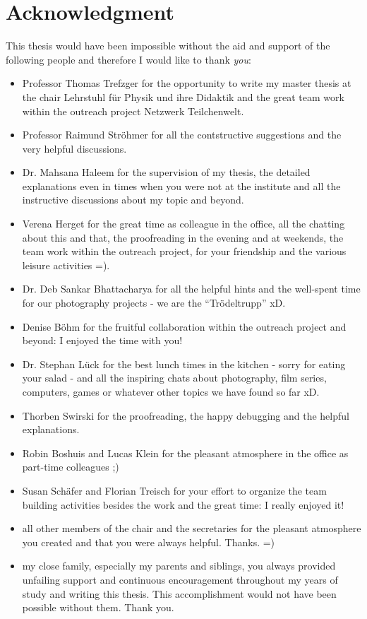 \chapter*{Acknowledgment}
This thesis would have been impossible without the aid and support of the following people and therefore I would like to thank \textit{you}:
\begin{itemize}
 \item Professor Thomas Trefzger for the opportunity to write my master thesis at the chair Lehrstuhl f\"{u}r Physik und ihre Didaktik and the great team work within the outreach project Netzwerk Teilchenwelt.
 \item Professor Raimund Str\"{o}hmer for all the contstructive suggestions and the very helpful discussions.
 \item Dr. Mahsana Haleem for the supervision of my thesis, the detailed explanations even in times when you were not at the institute and all the instructive discussions about my topic and beyond.
 \item Verena Herget for the great time as colleague in the office, all the chatting about this and that, the proofreading in the evening and at weekends, the team work within the outreach project, for your friendship and the various leisure activities =). 
 \item Dr. Deb Sankar Bhattacharya for all the helpful hints and the well-spent time for our photography projects - we are the ``Tr\"{o}deltrupp'' xD.
 \item Denise B\"{o}hm for the fruitful collaboration within the outreach project and beyond: I enjoyed the time with you!
 \item Dr. Stephan L\"{u}ck for the best lunch times in the kitchen - sorry for eating your salad - and all the inspiring chats about photography, film series, computers, games or whatever other topics we have found so far xD.
 \item Thorben Swirski for the proofreading, the happy debugging and the helpful explanations. 
 \item Robin Boshuis and Lucas Klein for the pleasant atmosphere in the office as part-time colleagues ;)
 \item Susan Sch\"{a}fer and Florian Treisch for your effort to organize the team building activities besides the work and the great time: I really enjoyed it!
 \item all other members of the chair and the secretaries for the pleasant atmosphere you created and that you were always helpful. Thanks. =) 
 \item my close family, especially my parents and siblings, you always provided unfailing support and continuous encouragement throughout my years of study and writing this thesis. This accomplishment would not have been possible without them. Thank you. 
\end{itemize}
